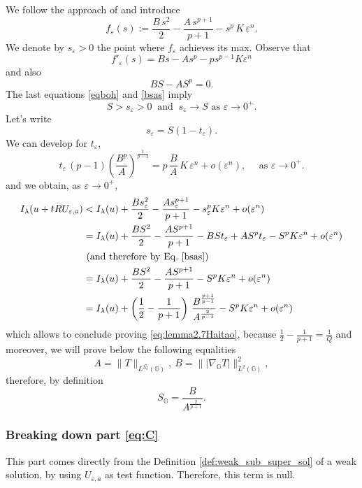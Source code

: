 \documentclass[11pt]{amsart}
\numberwithin{equation}{section} %
\theoremstyle{definition}
\def\G{\mathbb{G}}
\newcommand{\m}{\mbox}
\begin{document}
We follow the approach of \cite{Tarantello} and introduce
\[
f_\varepsilon(s):=\frac{B\, s^2}{2}-\frac{A \, s^{p+1}}{p+1}-s^p\, K\, \varepsilon^n.
\]
We denote by $s_\varepsilon>0$ the point where $f_\varepsilon$ achieves its max. Observe that
\begin{equation}\label{eqboh}
	f'_\varepsilon(s)=Bs-As^p-ps^{p-1}K\varepsilon^n
\end{equation}
and also
\begin{equation}\label{bsas}
BS-AS^p=0.
\end{equation}
The last equations \eqref{eqboh} and \eqref{bsas} imply
\[
S>s_\varepsilon>0\ \m{ and } \ s_\varepsilon\to S\m{ as }\varepsilon\to0^+.
\]
Let's write
\[
s_\varepsilon=S(1-t_\varepsilon).
\]
We can develop for $t_\varepsilon$,
\[
t_\varepsilon\, (p-1)\left(\frac{B^p}{A}\right)^{\frac{1}{p-1}}=p\, \frac{B}{A}\, K\, \varepsilon^n+o(\varepsilon^n), \quad \textrm{ as } \varepsilon \to 0^+.
\]
and we obtain, as $\varepsilon \to 0^+$,
\begin{align*}
    I_\lambda(u+tRU_{\varepsilon,a})
    &<I_\lambda(u)+\frac{Bs_\varepsilon^2}{2}-\frac{As_\varepsilon^{p+1}}{p+1}-s_\varepsilon^{p}K\varepsilon^n+o(\varepsilon^n)\\
    &=I_\lambda(u)+\frac{BS^2}{2}-\frac{AS^{p+1}}{p+1}-BSt_\varepsilon+AS^pt_\varepsilon-S^{p}K\varepsilon^n+o(\varepsilon^n)\\
    &\ (\m{and therefore by Eq.~\eqref{bsas}})\\
    &=I_\lambda(u)+\frac{BS^2}{2}-\frac{AS^{p+1}}{p+1}-S^pK\varepsilon^n+o(\varepsilon^n)\\
    &=I_\lambda(u)+\left(\frac{1}{2}-\frac{1}{p+1}
    \right)\, \frac{B^{\frac{p+1}{p-1}}}
    {A^{\frac{2}{p-1}}}
    -S^pK\varepsilon^n+o(\varepsilon^n)
\end{align*}
which allows to conclude proving \eqref{eq:lemma2.7Haitao}, because
$\frac{1}{2}-\frac{1}{p+1}=\frac{1}{Q}$ and
moreover, we will prove below the following equalities
\[
A=\|T\|_{L^{2^\star_Q}(\G)},\ B=\||\nabla_\G T|\|_{L^2(\G)}^2,
\]
therefore, by definition
\[
 S_{\G}=\frac{B}{A^\frac{2}{p+1}}.
\]

\subsubsection*{Breaking down part \eqref{eq:C}}
This part
comes directly from the Definition \ref{def:weak_sub_super_sol}
of a weak solution,
by using $U_{\varepsilon,a}$ as test function.
Therefore, this term is null.
\end{document}

